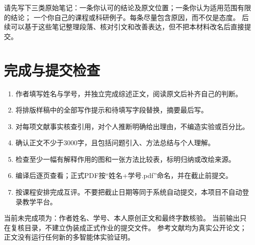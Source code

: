 \documentclass[UTF8,fontset=fandol,12pt,a4paper]{ctexart}
\begin{document}
请先写下三类原始笔记：一条你认可的结论及原文位置；一条你认为适用范围有限的结论；
一个你自己的课程或科研例子。每条尽量包含原因，而不仅是态度。
后续可以基于这些笔记整理段落、核对引文和改善表达，但不把本材料改名后直接提交。

\section{完成与提交检查}
\begin{enumerate}
\item 作者填写姓名与学号，并独立完成综述正文，阅读原文后补齐自己的判断。
\item 将排版样稿中的全部写作提示和待填写字段替换，摘要最后写。
\item 对每项文献事实核查引用，对个人推断明确给出理由，不编造实验或百分比。
\item 确认正文不少于3000字，且包括问题引入、方法总结与个人理解。
\item 检查至少一幅有解释作用的图和一张方法比较表，标明归纳或改绘来源。
\item 编译后逐页查看；正式PDF按“姓名+学号.pdf”命名，并在截止前提交。
\item 按课程安排完成互评。不要把截止日期等同于系统自动提交，本项目不自动登录教学平台。
\end{enumerate}

当前未完成项为：作者姓名、学号、本人原创正文和最终字数核验。
当前输出只在复核目录，不建立伪装成正式作业的提交文件。
参考文献均为真实公开论文；正文没有运行任何新的多智能体实验证明。


\end{document}
